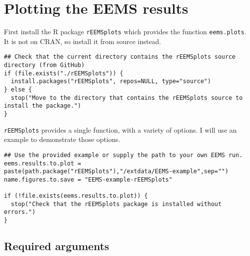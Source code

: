 \documentclass[a4paper,10pt,DIV=15,titlepage,mpinclude=true]{scrartcl}
\newcommand{\keystring}[1]{{\tt #1}}
\begin{document}
\newpage

\section{Plotting the EEMS results}\label{sec:plotting-eems}

First install the R package \keystring{rEEMSplots} which provides the function \keystring{eems.plots}. It is not on CRAN, so install it from source instead.

\begin{lstlisting}[style=Rcode]
## Check that the current directory contains the rEEMSplots source directory (from GitHub)
if (file.exists("./rEEMSplots")) {
  install.packages("rEEMSplots", repos=NULL, type="source")
} else {
  stop("Move to the directory that contains the rEEMSplots source to install the package.")
}
\end{lstlisting}

\keystring{rEEMSplots} provides a single function, with a variety of options. I will use an example to demonstrate those options.

\begin{lstlisting}[style=Rcode]
## Use the provided example or supply the path to your own EEMS run.
eems.results.to.plot = paste(path.package("rEEMSplots"),"/extdata/EEMS-example",sep="")
name.figures.to.save = "EEMS-example-rEEMSplots"

if (!file.exists(eems.results.to.plot)) {
  stop("Check that the rEEMSplots package is installed without errors.")
}
\end{lstlisting}

\subsection{Required arguments}
\end{document}
